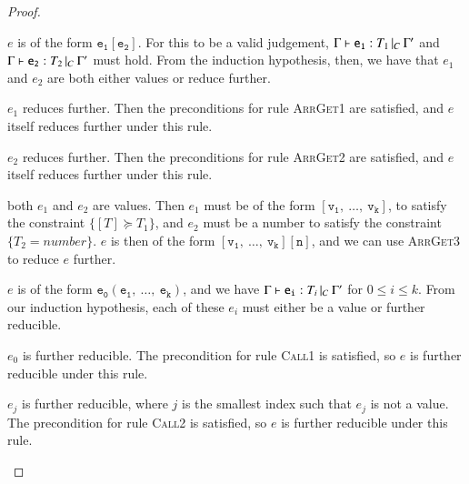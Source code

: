 \begin{proof}
  \begin{case}[ArrayType]\label{case:prog-arraytype}

	$e$ is of the form $\mathtt{e_1[e_2]}$. For this to be a valid
	judgement, $\Gamma{}\vdash\mathtt{e_1}: T_1\,|_C\:\Gamma'$ and $\Gamma{}\vdash\mathtt{e_2}: T_2\,|_C\:\Gamma'$ must hold. From
	the induction hypothesis, then, we have that $e_1$ and $e_2$ are both
	either values or reduce further.

	\begin{subcase}
	  $e_1$ reduces further.
	  Then the preconditions for rule
	  \textsc{ArrGet1} are satisfied, and $e$ itself reduces further under
	  this rule.
	\end{subcase}

	\begin{subcase}
	  $e_2$ reduces further. 
	  Then the preconditions for rule
	  \textsc{ArrGet2} are satisfied, and $e$ itself reduces further under
	  this rule.
  	\end{subcase}

  	\begin{subcase}
	  both $e_1$ and $e_2$ are values.
	  Then $e_1$ must be of the form 
	  $\mathtt{[v_1,\ \dots,\ v_k]}$, to satisfy the constraint $\{[T] \succeq T_1\}$,
	  and $e_2$ must be a number to satisfy the constraint $\{T_2=number\}$.
	  $e$ is then of the form $\mathtt{[v_1,\ \dots,\ v_k][n]}$, and we 
	  can use \textsc{ArrGet3} to reduce $e$ further.
  	\end{subcase}

  \end{case}

  \begin{case}[CallType]\label{case:prog-calltype}

  	$e$ is of the form $\mathtt{e_0(e_1,\ \dots,\ e_k)}$, and we have
  	$\Gamma{}\vdash\mathtt{e_i}: T_i\,|_C\:\Gamma'$ for $0\leq i \leq k$. From our induction hypothesis,
  	each of these $e_i$ must either be a value or further reducible.

  	\begin{subcase}
	  $e_0$ is further reducible.
	  The precondition for rule \textsc{Call1} is satisfied, so $e$ is further
	  reducible under this rule.
  	\end{subcase}

  	\begin{subcase}
	  $e_j$ is further reducible, 
	  where $j$ is the smallest index such that $e_j$ is not a value.
	  The precondition for rule \textsc{Call2} is satisfied, so $e$ is further
	  reducible under this rule.
  	\end{subcase}


\end{case}
\end{proof}
